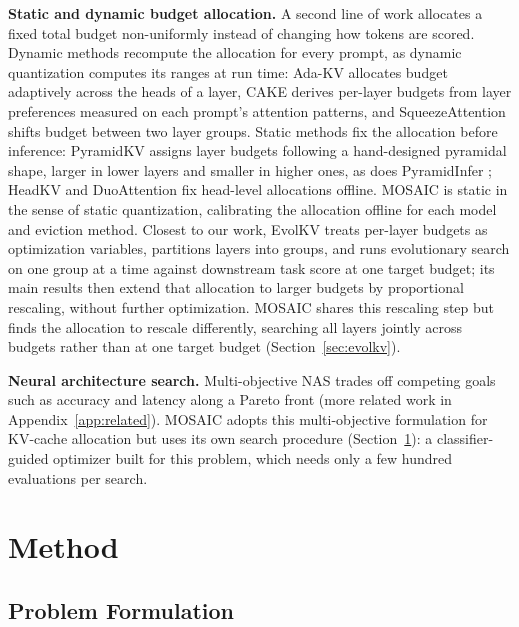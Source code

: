 \documentclass[11pt]{article}
\begin{document}
\textbf{Static and dynamic budget allocation.} A second line of work allocates a fixed total budget non-uniformly instead of changing how tokens are scored. Dynamic methods recompute the allocation for every prompt, as dynamic quantization computes its ranges at run time: Ada-KV \citep{feng2025adakv} allocates budget adaptively across the heads of a layer, CAKE \citep{qin2025cake} derives per-layer budgets from layer preferences measured on each prompt's attention patterns, and SqueezeAttention \citep{wang2025squeezeattention} shifts budget between two layer groups. Static methods fix the allocation before inference: PyramidKV \citep{cai2025pyramidkv} assigns layer budgets following a hand-designed pyramidal shape, larger in lower layers and smaller in higher ones, as does PyramidInfer \citep{yang2024pyramidinfer}; HeadKV \citep{fu2025headkv} and DuoAttention \citep{xiao2025duoattention} fix head-level allocations offline. MOSAIC is static in the sense of static quantization, calibrating the allocation offline for each model and eviction method. Closest to our work, EvolKV \citep{yu2025evolkv} treats per-layer budgets as optimization variables, partitions layers into groups, and runs evolutionary search on one group at a time against downstream task score at one target budget; its main results then extend that allocation to larger budgets by proportional rescaling, without further optimization. MOSAIC shares this rescaling step but finds the allocation to rescale differently, searching all layers jointly across budgets rather than at one target budget (Section~\ref{sec:evolkv}).

\textbf{Neural architecture search.} Multi-objective NAS trades off competing goals such as accuracy and latency along a Pareto front \citep{elsken2018neural} (more related work in Appendix~\ref{app:related}). MOSAIC adopts this multi-objective formulation for KV-cache allocation but uses its own search procedure (Section~\ref{sec:method}): a classifier-guided optimizer built for this problem, which needs only a few hundred evaluations per search.

\section{Method}
\label{sec:method}

\subsection{Problem Formulation}
\label{sec:formulation}
\end{document}
